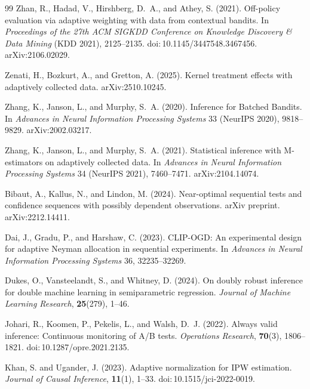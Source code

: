 \documentclass[11pt]{article}
\numberwithin{equation}{section}
\theoremstyle{plain}
\theoremstyle{definition}
\theoremstyle{remark}
\newcommand{\doi}[1]{doi:\,#1}
\newcommand{\arxiv}[1]{arXiv:#1}
\begin{document}
\begin{thebibliography}{99}
Zhan, R., Hadad, V., Hirshberg, D.~A., and Athey, S. (2021).
Off-policy evaluation via adaptive weighting with data from contextual bandits.
In \emph{Proceedings of the 27th ACM SIGKDD Conference on Knowledge Discovery \& Data Mining} (KDD 2021), 2125--2135. \doi{10.1145/3447548.3467456}. \arxiv{2106.02029}.

Zenati, H., Bozkurt, A., and Gretton, A. (2025).
Kernel treatment effects with adaptively collected data.
\arxiv{2510.10245}.

Zhang, K., Janson, L., and Murphy, S.~A. (2020).
Inference for Batched Bandits.
In \emph{Advances in Neural Information Processing Systems} 33 (NeurIPS 2020), 9818--9829. \arxiv{2002.03217}.

Zhang, K., Janson, L., and Murphy, S.~A. (2021).
Statistical inference with M-estimators on adaptively collected data.
In \emph{Advances in Neural Information Processing Systems} 34 (NeurIPS 2021), 7460--7471. \arxiv{2104.14074}.



Bibaut, A., Kallus, N., and Lindon, M. (2024).
Near-optimal sequential tests and confidence sequences with possibly dependent observations.
arXiv preprint. \arxiv{2212.14411}.

Dai, J., Gradu, P., and Harshaw, C. (2023).
CLIP-OGD: An experimental design for adaptive Neyman allocation in sequential experiments.
In \emph{Advances in Neural Information Processing Systems} 36, 32235--32269.

Dukes, O., Vansteelandt, S., and Whitney, D. (2024).
On doubly robust inference for double machine learning in semiparametric regression.
\emph{Journal of Machine Learning Research}, \textbf{25}(279), 1--46.

Johari, R., Koomen, P., Pekelis, L., and Walsh, D.~J. (2022).
Always valid inference: Continuous monitoring of A/B tests.
\emph{Operations Research}, \textbf{70}(3), 1806--1821. \doi{10.1287/opre.2021.2135}.

Khan, S. and Ugander, J. (2023).
Adaptive normalization for IPW estimation.
\emph{Journal of Causal Inference}, \textbf{11}(1), 1--33. \doi{10.1515/jci-2022-0019}.


\end{thebibliography}
\end{document}
